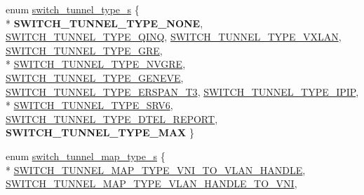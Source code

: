 \begin{DoxyCompactItemize}
\item 
enum \hyperlink{group__Tunnel_gae6e97544aa9d069ef7640927ba5f92aa}{switch\+\_\+tunnel\+\_\+type\+\_\+s} \{ \\*
{\bfseries S\+W\+I\+T\+C\+H\+\_\+\+T\+U\+N\+N\+E\+L\+\_\+\+T\+Y\+P\+E\+\_\+\+N\+O\+N\+E}, 
\hyperlink{group__Tunnel_ggae6e97544aa9d069ef7640927ba5f92aaad5df733370918231c8f13563934f60fd}{S\+W\+I\+T\+C\+H\+\_\+\+T\+U\+N\+N\+E\+L\+\_\+\+T\+Y\+P\+E\+\_\+\+Q\+I\+N\+Q}, 
\hyperlink{group__Tunnel_ggae6e97544aa9d069ef7640927ba5f92aaad4a41baf3c5f3130da297703e290248c}{S\+W\+I\+T\+C\+H\+\_\+\+T\+U\+N\+N\+E\+L\+\_\+\+T\+Y\+P\+E\+\_\+\+V\+X\+L\+A\+N}, 
\hyperlink{group__Tunnel_ggae6e97544aa9d069ef7640927ba5f92aaae1a0ba91dceb95390218ea33c2150b1d}{S\+W\+I\+T\+C\+H\+\_\+\+T\+U\+N\+N\+E\+L\+\_\+\+T\+Y\+P\+E\+\_\+\+G\+R\+E}, 
\\*
\hyperlink{group__Tunnel_ggae6e97544aa9d069ef7640927ba5f92aaa493851ce01e4c37628f86d14228ef1af}{S\+W\+I\+T\+C\+H\+\_\+\+T\+U\+N\+N\+E\+L\+\_\+\+T\+Y\+P\+E\+\_\+\+N\+V\+G\+R\+E}, 
\hyperlink{group__Tunnel_ggae6e97544aa9d069ef7640927ba5f92aaa68078ff6bca79368ada183ce6e241f7e}{S\+W\+I\+T\+C\+H\+\_\+\+T\+U\+N\+N\+E\+L\+\_\+\+T\+Y\+P\+E\+\_\+\+G\+E\+N\+E\+V\+E}, 
\hyperlink{group__Tunnel_ggae6e97544aa9d069ef7640927ba5f92aaaa2c526d95d1a6055b8a6f9a5daa1a100}{S\+W\+I\+T\+C\+H\+\_\+\+T\+U\+N\+N\+E\+L\+\_\+\+T\+Y\+P\+E\+\_\+\+E\+R\+S\+P\+A\+N\+\_\+\+T3}, 
\hyperlink{group__Tunnel_ggae6e97544aa9d069ef7640927ba5f92aaa974ad2ece6d8ef98900be8867017320d}{S\+W\+I\+T\+C\+H\+\_\+\+T\+U\+N\+N\+E\+L\+\_\+\+T\+Y\+P\+E\+\_\+\+I\+P\+I\+P}, 
\\*
\hyperlink{group__Tunnel_ggae6e97544aa9d069ef7640927ba5f92aaa4e8a2fbd8dd8c0ebf29aae049ef10233}{S\+W\+I\+T\+C\+H\+\_\+\+T\+U\+N\+N\+E\+L\+\_\+\+T\+Y\+P\+E\+\_\+\+S\+R\+V6}, 
\hyperlink{group__Tunnel_ggae6e97544aa9d069ef7640927ba5f92aaad48b30b4a980ef987855c156156c132d}{S\+W\+I\+T\+C\+H\+\_\+\+T\+U\+N\+N\+E\+L\+\_\+\+T\+Y\+P\+E\+\_\+\+D\+T\+E\+L\+\_\+\+R\+E\+P\+O\+R\+T}, 
{\bfseries S\+W\+I\+T\+C\+H\+\_\+\+T\+U\+N\+N\+E\+L\+\_\+\+T\+Y\+P\+E\+\_\+\+M\+A\+X}
 \}
\item 
enum \hyperlink{group__Tunnel_gac912a56b58661dcec8846d16be80de31}{switch\+\_\+tunnel\+\_\+map\+\_\+type\+\_\+s} \{ \\*
\hyperlink{group__Tunnel_ggac912a56b58661dcec8846d16be80de31ab2458708261280b7621ac40840481343}{S\+W\+I\+T\+C\+H\+\_\+\+T\+U\+N\+N\+E\+L\+\_\+\+M\+A\+P\+\_\+\+T\+Y\+P\+E\+\_\+\+V\+N\+I\+\_\+\+T\+O\+\_\+\+V\+L\+A\+N\+\_\+\+H\+A\+N\+D\+L\+E}, 
\hyperlink{group__Tunnel_ggac912a56b58661dcec8846d16be80de31a73a960fde645eda2b9d0fd21af48f4cd}{S\+W\+I\+T\+C\+H\+\_\+\+T\+U\+N\+N\+E\+L\+\_\+\+M\+A\+P\+\_\+\+T\+Y\+P\+E\+\_\+\+V\+L\+A\+N\+\_\+\+H\+A\+N\+D\+L\+E\+\_\+\+T\+O\+\_\+\+V\+N\+I}, 

\end{DoxyCompactItemize}
